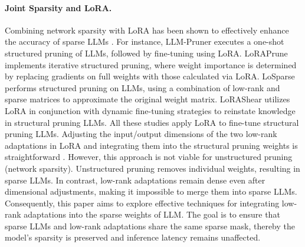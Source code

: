 \paragraph{Joint Sparsity and LoRA.} 
Combining network sparsity with LoRA has been shown to effectively enhance the accuracy of sparse LLMs \citep{li2024nuteprune,li2024lorap,zhao2024apt}. For instance, LLM-Pruner \citep{ma2023llm} executes a one-shot structured pruning of LLMs, followed by fine-tuning using LoRA. LoRAPrune \citep{zhang2023pruning} implements iterative structured pruning, where weight importance is determined by replacing gradients on full weights with those calculated via LoRA. LoSparse \citep{li2023losparse} performs structured pruning on LLMs, using a combination of low-rank and sparse matrices to approximate the original weight matrix. LoRAShear \citep{chen2023lorashear} utilizes LoRA in conjunction with dynamic fine-tuning strategies to reinstate knowledge in structural pruning LLMs. All these studies apply LoRA to fine-tune structural pruning LLMs. Adjusting the input/output dimensions of the two low-rank adaptations in LoRA and integrating them into the structural pruning weights is straightforward \citep{zhao2024apt,guo2023compresso}. However, this approach is not viable for unstructured pruning (network sparsity). Unstructured pruning removes individual weights, resulting in sparse LLMs. In contrast, low-rank adaptations remain dense even after dimensional adjustments, making it impossible to merge them into sparse LLMs. Consequently, this paper aims to explore effective techniques for integrating low-rank adaptations into the sparse weights of LLM. The goal is to ensure that sparse LLMs and low-rank adaptations share the same sparse mask, thereby the model's sparsity is preserved and inference latency remains unaffected.

\vspace{-0.5cm}